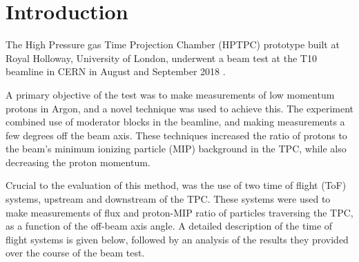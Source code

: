 \section{Introduction}

The High Pressure gas Time Projection Chamber (HPTPC) prototype built at Royal Holloway, University of London, underwent a beam test at the T10 beamline in CERN in August and September 2018 \cite{SPSC-P-355}.

A primary objective of the test was to make measurements of low momentum protons in Argon, and a novel technique was used to achieve this.
The experiment combined use of moderator blocks in the beamline, and making measurements a few degrees off the beam axis.
These techniques increased the ratio of protons to the beam's minimum ionizing particle (MIP) background in the TPC, while also decreasing the proton momentum.

Crucial to the evaluation of this method, was the use of two time of flight (ToF) systems, upstream and downstream of the TPC.
These systems were used to make measurements of flux and proton-MIP ratio of particles traversing the TPC, as a function of the off-beam axis angle.
A detailed description of the time of flight systems is given below, followed by an analysis of the results they provided over the course of the beam test.